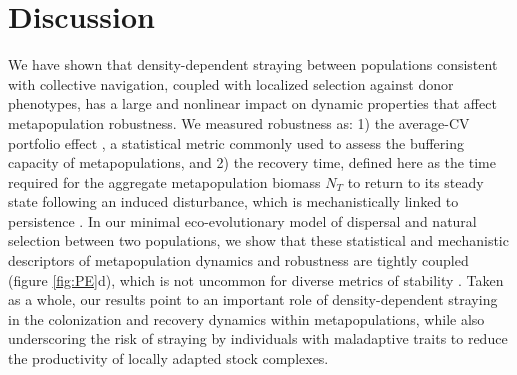 \documentclass{revtex4}
\begin{document}
\section{Discussion}

We have shown that density-dependent straying between populations consistent with collective navigation, coupled with localized selection against donor phenotypes, has a large and nonlinear impact on dynamic properties that affect metapopulation robustness.
We measured robustness as:
1) the average-CV portfolio effect \citep{Anderson:2013gb,Anonymous:2015gf}, a statistical metric commonly used to assess the buffering capacity of metapopulations, and
2) the recovery time, defined here as the time required for the aggregate metapopulation biomass $N_T$ to return to its steady state following an induced disturbance, which is mechanistically linked to persistence \citep{Ovaskainen:2002il}.
In our minimal eco-evolutionary model of dispersal and natural selection between two populations, we show that these statistical and mechanistic descriptors of metapopulation dynamics and robustness are tightly coupled (figure \ref{fig:PE}d), which is not uncommon for diverse metrics of stability \citep{Donohue:2013iu}.
Taken as a whole, our results point to an important role of density-dependent straying in the colonization and recovery dynamics within metapopulations, while also underscoring the risk of straying by individuals with maladaptive traits to reduce the productivity of locally adapted stock complexes.

% 
% 
\end{document}
